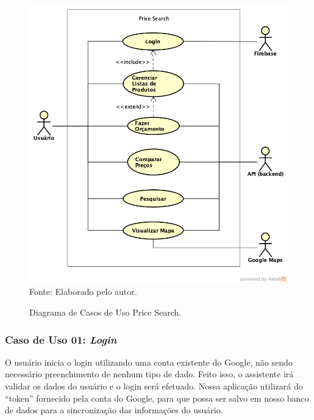 \begin{figure}[!htb]
\centering
\caption{Diagrama de Casos de Uso Price Search.}
\includegraphics[width=\linewidth]{figuras/DiagramaCasosUsoPriceSearch.png}
{\footnotesize Fonte: Elaborado pelo autor.}
\end{figure}

\subsubsection{Caso de Uso 01: \textit{Login}}

O usuário inicia o login utilizando uma conta existente do Google, não sendo necessário preenchimento de nenhum tipo de dado. Feito isso, o assistente irá validar os dados do usuário e o login será efetuado. Nossa aplicação utilizará do ``token'' fornecido pela conta do Google, para que possa ser salvo em nosso banco de dados para a sincronização das informações do usuário.


